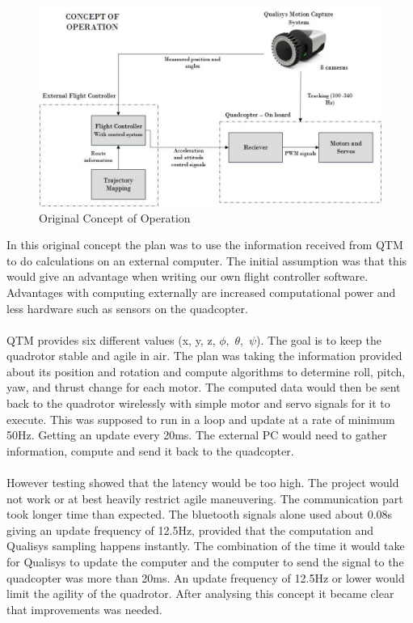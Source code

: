 \begin{figure}[H]
          \centering
            \includegraphics[scale = 0.6]{VAPIQ-PICTURES/ConceptOfOperation.jpg}
                \caption{Original Concept of Operation}
                \label{OCO}
            \label{dir}
\end{figure} 
\newpage
\noindent 
In this original concept the plan was to use the information received from QTM to do calculations on an external computer. The initial assumption was that this would give an advantage when writing our own flight controller software. Advantages with computing externally are increased computational power and less hardware such as sensors on the quadcopter. 
\\\\
QTM provides six different values (x, y, z, $ \phi, $ $ \theta ,$ $ \psi $). The goal is to keep the quadrotor stable and agile in air. The plan was taking the information provided about its position and rotation and compute algorithms to determine roll, pitch, yaw, and thrust change for each motor. The computed data would then be sent back to the quadrotor wirelessly with simple motor and servo signals for it to execute. This was supposed to run in a loop and update at a rate of minimum 50Hz. Getting an update every 20ms. The external PC would need to gather information, compute and send it back to the quadcopter. \\
\\
However testing showed that the latency would be too high. The project would not work or at best heavily restrict agile maneuvering. The communication part took longer time than expected. The bluetooth signals alone used about 0.08s giving an update frequency of 12.5Hz, provided that the computation and Qualisys sampling happens instantly. The combination of the time it would take for Qualisys to update the computer and the computer to send the signal to the quadcopter was more than 20ms. An update frequency of 12.5Hz or lower would limit the agility of the quadrotor. After analysing this concept it became clear that improvements was needed.

